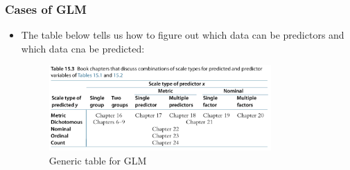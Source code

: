 \documentclass[a4paper]{article}
\begin{document}
\subsubsection{Cases of GLM}
\begin{itemize}
    \item The table below tells us how to figure out which data can be predictors and which data cna be predicted:
    \begin{figure}[H]
        \centering
        \includegraphics[width=0.8\textwidth]{glm_table}
        \caption{Generic table for GLM}
        \label{fig:glm_table}
    \end{figure}
\end{itemize}
\end{document}

